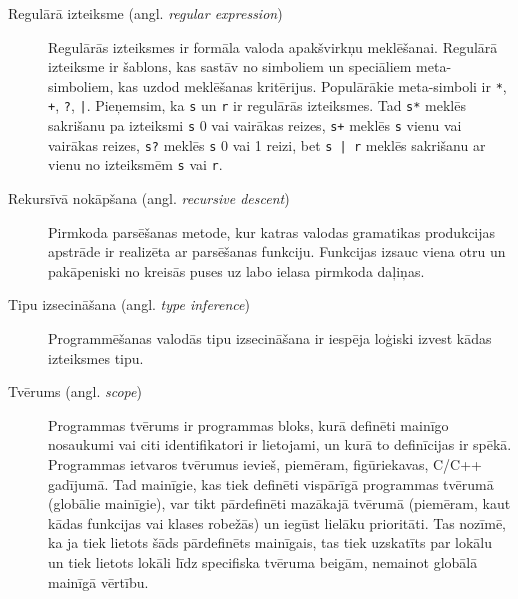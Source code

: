 \begin{description}
\item[Regulārā izteiksme (angl. \emph{regular expression})]
Regulārās izteiksmes ir formāla valoda apakšvirkņu meklēšanai. Regulārā izteiksme ir šablons, kas sastāv no simboliem un speciāliem meta-simboliem, kas uzdod meklēšanas kritērijus. Populārākie meta-simboli ir \texttt{*}, \texttt{+}, \texttt{?},    \texttt{|}. Pieņemsim, ka \texttt{s} un \texttt{r} ir regulārās izteiksmes. Tad \texttt{s*} meklēs sakrišanu pa izteiksmi \texttt{s} 0 vai vairākas reizes, \texttt{s+} meklēs \texttt{s} vienu vai vairākas reizes, \texttt{s?} meklēs \texttt{s} 0 vai 1 reizi, bet  \texttt{s | r} meklēs sakrišanu ar vienu no izteiksmēm \texttt{s} vai \texttt{r}.

\item[Rekursīvā nokāpšana (angl. \emph{recursive descent})]
Pirmkoda parsēšanas metode, kur katras valodas gramatikas produkcijas apstrāde ir realizēta ar parsēšanas funkciju. Funkcijas izsauc viena otru un pakāpeniski no kreisās puses uz labo ielasa pirmkoda daļiņas.

\item[Tipu izsecināšana (angl. \emph{type inference})]
Programmēšanas valodās tipu izsecināšana ir iespēja loģiski izvest kādas izteiksmes tipu.

\item[Tvērums (angl. \emph{scope})]
Programmas tvērums ir programmas bloks, kurā definēti mainīgo nosaukumi vai citi identifikatori ir lietojami, un kurā to definīcijas ir spēkā. Programmas ietvaros tvērumus ievieš, piemēram, figūriekavas, C/C++ gadījumā. Tad mainīgie, kas tiek definēti vispārīgā programmas tvērumā (globālie mainīgie), var tikt pārdefinēti mazākajā tvērumā (piemēram, kaut kādas funkcijas vai klases robežās) un iegūst lielāku prioritāti. Tas nozīmē, ka ja tiek lietots šāds pārdefinēts mainīgais, tas tiek uzskatīts par lokālu un tiek lietots lokāli līdz specifiska tvēruma beigām, nemainot globālā mainīgā vērtību.
\end{description}